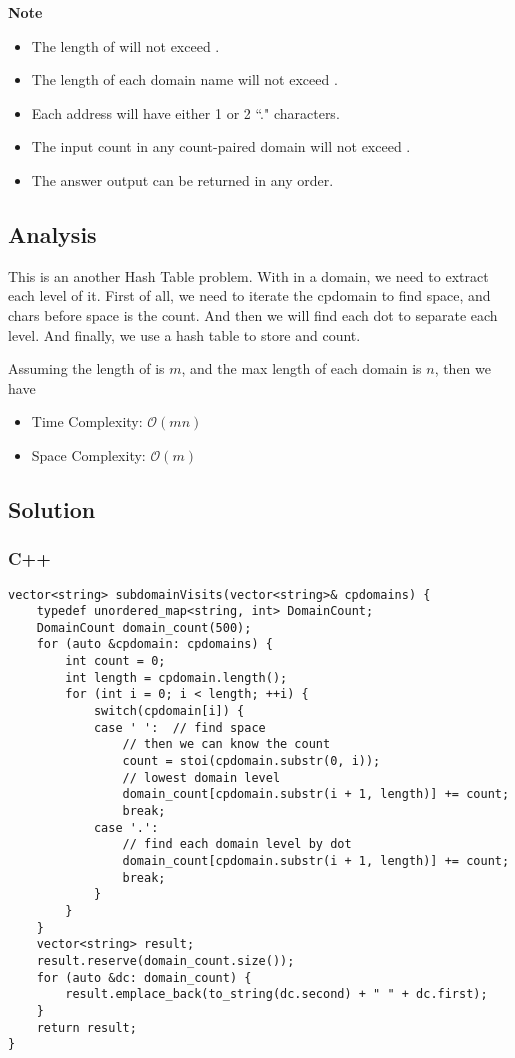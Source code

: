 \textbf{Note}
\begin{itemize}
\item The length of  will not exceed .
\item The length of each domain name will not exceed .
\item Each address will have either 1 or 2 ``." characters.
\item The input count in any count-paired domain will not exceed .
\item The answer output can be returned in any order.
\end{itemize}

\subsection*{Analysis}
This is an another Hash Table problem. With in a domain, we need to extract each level of it. First of all, we need to iterate the cpdomain to find space, and chars before space is the count. And then we will find each dot to separate each level. And finally, we use a hash table to store and count.

Assuming the length of  is $m$, and the max length of each domain is $n$, then we have
\begin{itemize}
\item Time Complexity: $\mathcal{O}(mn)$
\item Space Complexity: $\mathcal{O}(m)$
\end{itemize}

\subsection*{Solution}
\subsubsection*{C++}
\begin{verbatim}
vector<string> subdomainVisits(vector<string>& cpdomains) {
    typedef unordered_map<string, int> DomainCount;
    DomainCount domain_count(500);
    for (auto &cpdomain: cpdomains) {
        int count = 0;
        int length = cpdomain.length();
        for (int i = 0; i < length; ++i) {
            switch(cpdomain[i]) {
            case ' ':  // find space
                // then we can know the count
                count = stoi(cpdomain.substr(0, i));
                // lowest domain level
                domain_count[cpdomain.substr(i + 1, length)] += count;
                break;
            case '.':
                // find each domain level by dot
                domain_count[cpdomain.substr(i + 1, length)] += count;
                break;
            }
        }
    }
    vector<string> result;
    result.reserve(domain_count.size());
    for (auto &dc: domain_count) {
        result.emplace_back(to_string(dc.second) + " " + dc.first);
    }
    return result;
}
\end{verbatim}

\newpage

